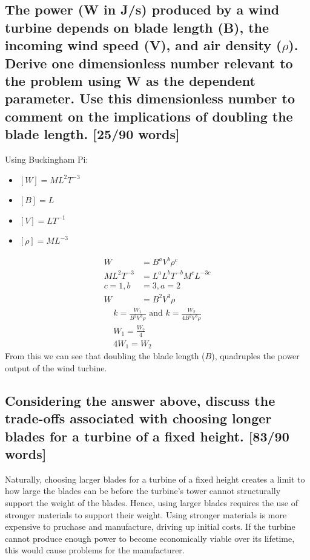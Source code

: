\documentclass[12pt]{article}
\numberwithin{equation}{section}
\begin{document}
\begin{flushleft}
\subsection[Dimensionless number derivation.]{The power (W in J/s) produced by a wind turbine depends on blade length (B), the incoming wind speed (V), and air density (\(\rho\)). Derive one dimensionless number relevant to the problem using W as the dependent parameter. Use this dimensionless number to comment on the implications of doubling the blade length. [25/90 words]}
Using Buckingham Pi:
\begin{multicols}{2}
  \begin{itemize}
    \item $[W] = ML^2T^{-3}$
    \item $[B] = L$
    \item $[V] = LT^{-1}$
    \item $[\rho] = ML^{-3}$
  \end{itemize}
\end{multicols}
\begin{align}
  W &= B^a V^b \rho^c\\
  ML^2T^{-3} &= L^a L^b T^{-b} M^c L^{-3c}\\
  c = 1, b &= 3, a = 2\\
  W &= B^2 V^3 \rho
\end{align}
\begin{gather}
  k = \frac{W_1}{B^2 V^3 \rho} \textrm{ and } k = \frac{W_2}{4B^2 V^3 \rho}\\
  W_1 = \frac{W_2}{4} \\
  4W_1 = W_2
\end{gather}
From this we can see that doubling the blade length (\(B\)), quadruples the power output of the wind turbine.

\subsection[Trade-offs with longer blade.]{Considering the answer above, discuss the trade-offs associated with choosing longer blades for a turbine of a fixed height. [83/90 words]}
Naturally, choosing larger blades for a turbine of a fixed height creates a limit to how large the blades can be before the turbine’s tower cannot structurally support the weight of the blades. Hence, using larger blades requires the use of stronger materials to support their weight. Using stronger materials is more expensive to pruchase and manufacture, driving up initial costs. If the turbine cannot produce enough power to become economically viable over its lifetime, this would cause problems for the manufacturer.


\end{flushleft}
\end{document}
